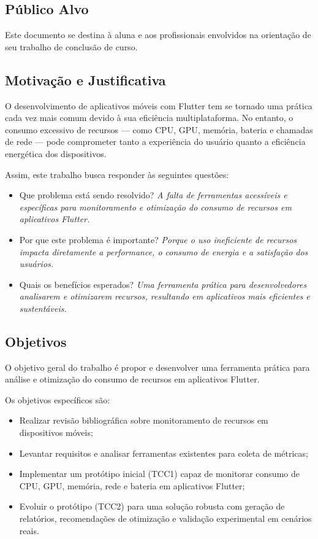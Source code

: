 \documentclass[12pt,a4paper]{article}
\begin{document}
\subsection{Público Alvo}
Este documento se destina à aluna e aos profissionais envolvidos na orientação de seu trabalho de conclusão de curso.

\subsection{Motivação e Justificativa}
O desenvolvimento de aplicativos móveis com Flutter tem se tornado uma prática cada vez mais comum devido à sua eficiência multiplataforma. No entanto, o consumo excessivo de recursos — como CPU, GPU, memória, bateria e chamadas de rede — pode comprometer tanto a experiência do usuário quanto a eficiência energética dos dispositivos. 

Assim, este trabalho busca responder às seguintes questões:
\begin{itemize}
    \item Que problema está sendo resolvido? \textit{A falta de ferramentas acessíveis e específicas para monitoramento e otimização do consumo de recursos em aplicativos Flutter.}
    \item Por que este problema é importante? \textit{Porque o uso ineficiente de recursos impacta diretamente a performance, o consumo de energia e a satisfação dos usuários.}
    \item Quais os benefícios esperados? \textit{Uma ferramenta prática para desenvolvedores analisarem e otimizarem recursos, resultando em aplicativos mais eficientes e sustentáveis.}
\end{itemize}

\subsection{Objetivos}
O objetivo geral do trabalho é propor e desenvolver uma ferramenta prática para análise e otimização do consumo de recursos em aplicativos Flutter.

Os objetivos específicos são:
\begin{itemize}
    \item Realizar revisão bibliográfica sobre monitoramento de recursos em dispositivos móveis;
    \item Levantar requisitos e analisar ferramentas existentes para coleta de métricas;
    \item Implementar um protótipo inicial (TCC1) capaz de monitorar consumo de CPU, GPU, memória, rede e bateria em aplicativos Flutter;
    \item Evoluir o protótipo (TCC2) para uma solução robusta com geração de relatórios, recomendações de otimização e validação experimental em cenários reais.
\end{itemize}
\end{document}

